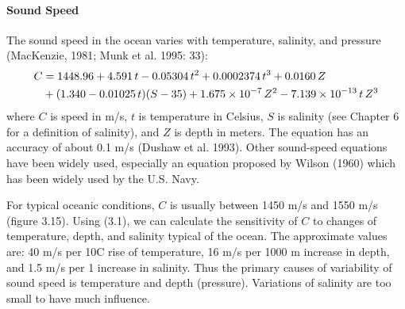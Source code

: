 \paragraph{Sound Speed}
The sound speed in the ocean varies with
temperature, salinity, and pressure (MacKenzie, 1981; Munk et
al. 1995: 33):
\begin{align}
  C & = 1448.96 + 4.591\,t - 0.05304\,t^2 + 0.0002374\,t^3+ 0.0160\,Z \\
  &+ (1.340 - 0.01025\,t) (S - 35) + 1.675 \times 10^{-7}\,Z^2 - 7.139 \times
10^{-13}\,t\,Z^3 \notag
\end{align}
where $C$ is speed in m/s, $t$ is temperature in Celsius, $S$ is
salinity (see Chapter 6 for a definition of salinity), and $Z$ is
depth in meters. The equation has an
accuracy of about 0.1 m/s (Dushaw
et al. 1993). Other sound-speed equations have been widely used,
especially an equation proposed by Wilson (1960) which has been widely
used by the U.S. Navy.

For typical oceanic conditions, $C$ is usually between 1450 m/s and
1550 m/s (figure 3.15). Using (3.1), we can calculate the sensitivity
of $C$ to changes of temperature, depth, and salinity typical of the
ocean. The approximate values are: 40 m/s per 10\degrees C rise of
temperature, 16 m/s per 1000 m increase in depth, and 1.5 m/s per 1
increase in salinity. Thus the primary causes of variability of sound
speed is temperature and depth
(pressure).  Variations of salinity are too small to have much
influence.

